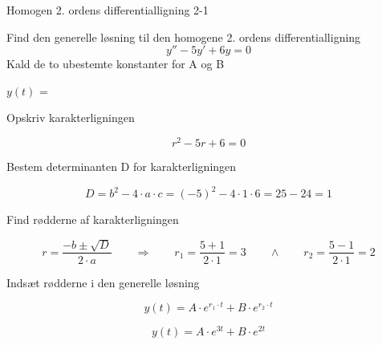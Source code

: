\documentclass{article}
\begin{document}
\begin{exercise}{Homogen 2. ordens differentialligning 2-1}
	
	Find den generelle løsning til den homogene 2. ordens differentialligning
	\[
	y'' - 5y' + 6y = 0
	\]
	Kald de to ubestemte konstanter for A og B
	
	$y(t)$ = 
	
	
	\hint 
	
	Opskriv karakterligningen
	
	\hint
	
	\[
	r^2 -5r + 6 = 0
	\]
	
	
	\hint
	
	Bestem determinanten D for karakterligningen
	
	
	\hint 
	\[
	D = b^2 - 4 \cdot a \cdot c = (-5)^2 - 4 \cdot 1 \cdot 6  = 25 - 24 = 1
	\]
	
	\hint 
	Find rødderne af karakterligningen
	
	
	\hint
	
	\[
	r = \frac{-b \pm \sqrt{D}}{2 \cdot a} \qquad  \Rightarrow \qquad r_1 = \frac{5 + 1}{2 \cdot 1} = 3 \qquad \wedge \qquad r_2 = \frac{5 - 1}{2 \cdot 1} = 2
	\]
	
	\hint
	
	Indsæt rødderne i den generelle løsning
	
	\hint
	\[
	y(t) = A \cdot e^{r_1 \cdot t} + B \cdot e^{r_2\cdot t}
	\]
	
	\hint
	
	\[
	y(t) = A \cdot e^{3t} + B \cdot e^{2t}
	\]
	
	
\end{exercise}

\newpage
\end{document}
